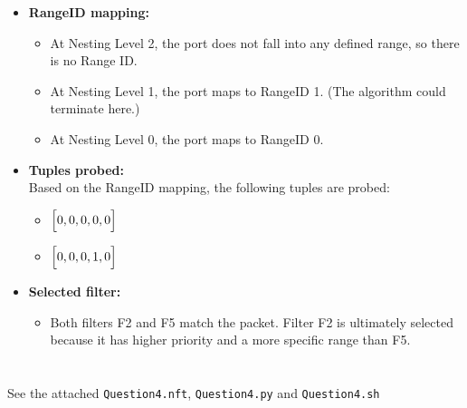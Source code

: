 \documentclass{article}
\begin{document}
        \begin{itemize}
            \item \textbf{RangeID mapping:}
            \begin{itemize}
                \item At Nesting Level 2, the port does not fall into any defined range, so there is no Range ID.
                \item At Nesting Level 1, the port maps to RangeID 1. (The algorithm could terminate here.)
                \item At Nesting Level 0, the port maps to RangeID 0.
            \end{itemize}
            
            \item \textbf{Tuples probed:}\\
            Based on the RangeID mapping, the following tuples are probed:
            \begin{itemize}
                \item $\Bigl[ 0, 0, 0, 0, 0\Bigr]$
                \item $\Bigl[ 0, 0, 0, 1, 0\Bigr]$
            \end{itemize}
            
            \item \textbf{Selected filter:}
            \begin{itemize}
                \item Both filters F2 and F5 match the packet. Filter F2 is ultimately selected because it has higher priority and a more specific range than F5.
            \end{itemize}
        \end{itemize}



   \section{}
    See the attached \verb|Question4.nft|, \verb|Question4.py| and \verb|Question4.sh|
    
    
\end{document}
